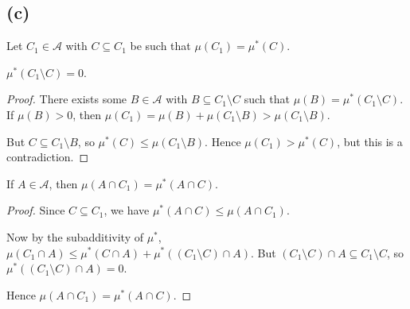 \documentclass{unswmaths}
\begin{document}
\subsection*{(c)}
Let $C_1 \in \mathcal{A}$
with $C \subseteq C_1$
be such that $\mu(C_1) = \mu^*(C)$.

\begin{lemma}
    $\mu^*(C_1\setminus C) = 0$.
\end{lemma}
\begin{proof}
    There exists some $B \in \mathcal{A}$ with $B \subseteq C_1\setminus C$
    such that $\mu(B) = \mu^*(C_1\setminus C)$.
    If $\mu(B) > 0$, then $\mu(C_1) = \mu(B) + \mu(C_1\setminus B) > \mu(C_1\setminus B)$.
    
    But $C \subseteq C_1\setminus B$, so $\mu^*(C) \leq \mu(C_1\setminus B)$.
    Hence $\mu(C_1) > \mu^*(C)$, but this is a contradiction.    
\end{proof} 

\begin{lemma}
    If $A \in \mathcal{A}$, then $\mu(A\cap C_1) = \mu^*(A\cap C)$.
\end{lemma}
\begin{proof}
    Since $C \subseteq C_1$, we have $\mu^*(A\cap C) \leq \mu(A\cap C_1)$.
    
    Now by the subadditivity of $\mu^*$, $\mu(C_1\cap A) \leq \mu^*(C\cap A) + \mu^*((C_1\setminus C)\cap A)$.
    But $(C_1\setminus C)\cap A\subseteq C_1\setminus C$, so $\mu^*((C_1\setminus C)\cap A) = 0$.
    
    Hence $\mu(A\cap C_1) = \mu^*(A\cap C)$.
\end{proof}
\end{document}
